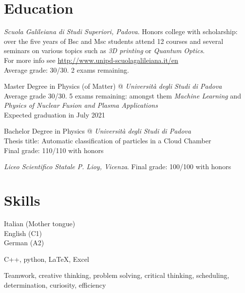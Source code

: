 \documentclass[11pt, a4 paper]{article}
\begin{document}
\section*{Education}
  \begin{description}[style=multiline,leftmargin=3cm,align=right]
    \item[2016-present]
      \emph{Scuola Galileiana di Studi Superiori, Padova}. Honors college with scholarship: over the five years of Bsc and Msc students attend 12 courses and several seminars on various topics such as \emph{3D printing} or \emph{Quantum Optics}. \\ For more info see \url{http://www.unipd-scuolagalileiana.it/en} \\
      Average grade: 30/30. 2 exams remaining.
    \item[2019-present]
      Master Degree in Physics (of Matter) @ \emph{Università degli Studi di Padova} \\
      Average grade 30/30. 5 exams remaining: amongst them \emph{Machine Learning} and \emph{Physics of Nuclear Fusion and Plasma Applications} \\
      Expected graduation in July 2021
    \item[2016-2019]
      Bachelor Degree in Physics @ \emph{Università degli Studi di Padova} \\
      Thesis title: Automatic classification of particles in a Cloud Chamber \\
      Final grade: 110/110 with honors
    \item[2011-2016]
      \emph{Liceo Scientifico Statale P. Lioy, Vicenza}. Final grade: 100/100 with honors
  \end{description}




\section*{Skills}
  \begin{description}[style=multiline,leftmargin=3cm,align=right]
    \item[Languages]
      Italian (Mother tongue) \\
      English (C1) \\
      German (A2)
    \item[Software]
      C++, python, LaTeX, Excel
    \item[Transversal]
      Teamwork, creative thinking, problem solving, critical thinking, scheduling, determination, curiosity, efficiency
  \end{description}
\end{document}

